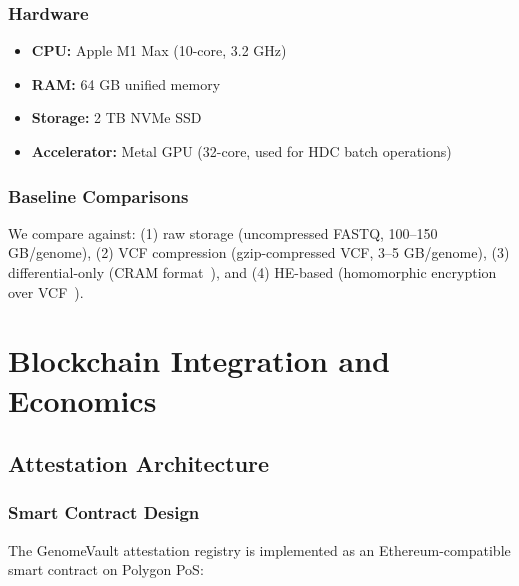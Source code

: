 \documentclass[12pt,a4paper]{article}
\begin{document}
\subsubsection{Hardware}

\begin{itemize}
\item \textbf{CPU:} Apple M1 Max (10-core, 3.2 GHz)
\item \textbf{RAM:} 64 GB unified memory
\item \textbf{Storage:} 2 TB NVMe SSD
\item \textbf{Accelerator:} Metal GPU (32-core, used for HDC batch operations)
\end{itemize}

\subsubsection{Baseline Comparisons}

We compare against: (1) raw storage (uncompressed FASTQ, 100--150 GB/genome), (2) VCF compression (gzip-compressed VCF, 3--5 GB/genome), (3) differential-only (CRAM format~\cite{Fritz2011}), and (4) HE-based (homomorphic encryption over VCF~\cite{Ayday2013}).

\section{Blockchain Integration and Economics}

\subsection{Attestation Architecture}

\subsubsection{Smart Contract Design}

The GenomeVault attestation registry is implemented as an Ethereum-compatible smart contract on Polygon PoS:
\end{document}
